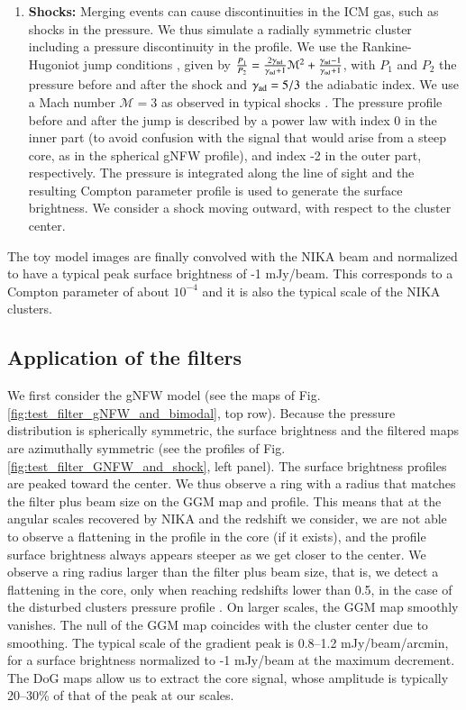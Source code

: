 \documentclass[traditabstract]{aa}
\begin{document}
\begin{enumerate}
\item {\bf Shocks:} Merging events can cause discontinuities in the ICM gas, such as shocks in the pressure. We thus simulate a radially symmetric cluster including a pressure discontinuity in the profile. We use the Rankine-Hugoniot jump conditions \citep[see e.g.,][for a review]{Sarazin2002}, given by $\frac{P_1}{P_2} = \frac{2 \gamma_{\rm ad}}{\gamma_{\rm ad}+1} \mathcal{M}^2 + \frac{\gamma_{\rm ad}-1}{\gamma_{\rm ad}+1}$, with $P_1$ and $P_2$ the pressure before and after the shock and $\gamma_{\rm ad} = 5/3$ the adiabatic index. We use a Mach number $\mathcal{M} = 3$ as observed in typical shocks \citep[e.g.,][]{Markevitch2007}. The pressure profile before and after the jump is described by a power law with index 0 in the inner part (to avoid confusion with the signal that would arise from a steep core, as in the spherical gNFW profile), and index -2 in the outer part, respectively. The pressure is integrated along the line of sight and the resulting Compton parameter profile is used to generate the surface brightness. We consider a shock moving outward, with respect to the cluster center.
\end{enumerate}
The toy model images are finally convolved with the NIKA beam and normalized to have a typical peak surface brightness of -1 mJy/beam. This corresponds to a Compton parameter of about $10^{-4}$ and it is also the typical scale of the NIKA clusters.

\subsection{Application of the filters}
We first consider the gNFW model (see the maps of Fig. \ref{fig:test_filter_gNFW_and_bimodal}, top row). Because the pressure distribution is spherically symmetric, the surface brightness and the filtered maps are azimuthally symmetric (see the profiles of Fig. \ref{fig:test_filter_GNFW_and_shock}, left panel). The surface brightness profiles are peaked toward the center. We thus observe a ring with a radius that matches the filter plus beam size on the GGM map and profile. This means that at the angular scales recovered by NIKA and the redshift we consider, we are not able to observe a flattening in the profile in the core (if it exists), and the profile surface brightness always appears steeper as we get closer to the center. We observe a ring radius larger than the filter plus beam size, that is, we detect a flattening in the core, only when reaching redshifts lower than 0.5, in the case of the disturbed clusters pressure profile \citep[i.e., the flattest that we consider here][]{Arnaud2010}. On larger scales, the GGM map smoothly vanishes. The null of the GGM map coincides with the cluster center due to smoothing. The typical scale of the gradient peak is 0.8--1.2 mJy/beam/arcmin, for a surface brightness normalized to -1 mJy/beam at the maximum decrement. The DoG maps allow us to extract the core signal, whose amplitude is typically 20--30\% of that of the peak at our scales.
\end{document}
